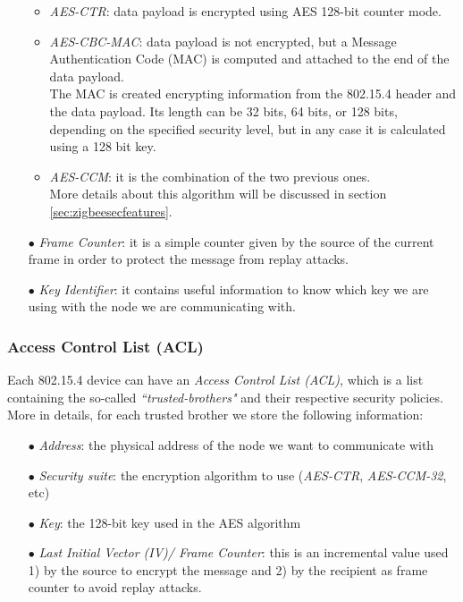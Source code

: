 \documentclass[12pt]{report}
\begin{document}
\begin{itemize}
\begin{itemize}
\setlength{\itemindent}{+4mm}
\item \emph{AES-CTR}: data payload is encrypted using AES 128-bit counter mode.
\item \emph{AES-CBC-MAC}: data payload is not encrypted, but a Message Authentication Code (MAC) is computed and attached to the end of the   data payload.\\
The MAC is created encrypting information from the 802.15.4 header and the data payload.
Its length can be 32 bits, 64 bits, or 128 bits, depending on the specified security level, but in any case it is calculated using a 128 bit key.
\item \emph{AES-CCM}: it is the combination of the two previous ones.\\
More details about this algorithm will be discussed in section \ref{sec:zigbeesecfeatures}.
\end{itemize}

\item[$\bullet$] \emph{Frame Counter}: it is a simple counter given by the source of the current frame in order to protect the message from replay attacks. 

\item[$\bullet$] \emph{Key Identifier}: it contains useful information to know which key we are using with the node we are communicating with.\\
\end{itemize}

\subsubsection{Access Control List (ACL)}
\bigskip

Each 802.15.4 device can have an \emph{Access Control List (ACL)}, which is a list containing the so-called \emph{``trusted-brothers"} and their respective security policies.\\
More in details, for each trusted brother we store the following information:

\begin{itemize}
\setlength{\itemindent}{+4mm}
\item[$\bullet$] \emph{Address}: the physical address of the node we want to communicate with
\item[$\bullet$] \emph{Security suite}: the encryption algorithm to use (\emph{AES-CTR}, \emph{AES-CCM-32}, etc)
\item[$\bullet$] \emph{Key}: the 128-bit key used in the AES algorithm
\item[$\bullet$] \emph{Last Initial Vector (IV)/ Frame Counter}: this is an incremental value used 1) by the source to encrypt the message and 2) by the recipient as frame counter to avoid replay attacks.\\
\end{itemize}
\end{document}
